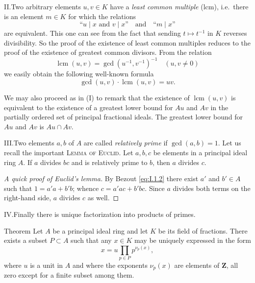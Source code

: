 \medskip
\noindent II.\quad Two arbitrary elements $u,v\in K$ have a \emph{least
common multiple} (lcm), i.e.\ there is an element $m\in K$ for which the
relations
\begin{equation}
\text{``}u\mid x\text{ and }v\mid x\text{''}\quad\text{and}\quad
\text{``}m\mid x\text{''}
\label{eq:I.1.3}
\end{equation}
are equivalent. This one can see from the fact that sending $t\mapsto t^{-1}$
in $K$ reverses divisibility. So the proof of the existence of least common
multiples reduces to the proof of the existence of greatest common divisors.
From the relation
\begin{equation}
\operatorname{lcm}(u,v)=\operatorname{gcd}(u^{-1},v^{-1})^{-1}
\quad(u,v\neq0)
\label{eq:I.1.4}
\end{equation}
we easily obtain the following well-known formula
\begin{equation}
\operatorname{gcd}(u,v)\cdot\operatorname{lcm}(u,v)=uv.
\label{eq:I.1.5}
\end{equation}

We may also proceed as in (I) to remark that the existence of
$\operatorname{lcm}(u,v)$ is equivalent to the existence of a greatest lower
bound for $Au$ and $Av$ in the partially ordered set of principal fractional
ideals. The greatest lower bound for $Au$ and $Av$ is $Au\cap Av$.

\medskip
\noindent III.\quad Two elements $a,b$ of $A$ are called \emph{relatively
prime} if $\gcd(a,b)=1$. Let us recall the important \textsc{Lemma of
Euclid}. Let $a,b,c$ be elements in a principal ideal ring $A$. If $a$
divides $bc$ and is relatively prime to $b$, then $a$ divides $c$.

\begin{proof}[A quick proof of Euclid's lemma]
By Bezout \eqref{eq:I.1.2} there exist $a'$ and $b'\in A$ such that
$1=a'a+b'b$; whence $c=a'ac+b'bc$. Since $a$ divides both terms on the
right-hand side, $a$ divides $c$ as well.
\end{proof}

\medskip
\noindent IV.\quad Finally there is unique factorization into products of
primes.

\begin{statement}{Theorem}
Let $A$ be a principal ideal ring and let $K$ be its field of fractions.
There exists a subset $P\subset A$ such that any $x\in K$ may be uniquely
expressed in the form
\begin{equation}
x=u\prod_{p\in P}p^{\nu_{p}(x)},
\label{eq:I.1.6}
\end{equation}
where $u$ is a unit in $A$ and where the exponents $\nu_{p}(x)$ are elements
of $\mathbf{Z}$, all zero except for a finite subset among them.
\end{statement}

